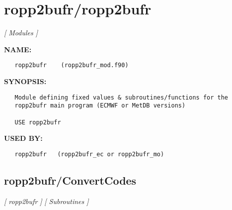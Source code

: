 \section{ropp2bufr/ropp2bufr}
\textsl{[ Modules ]}

\label{ch:robo102}
\label{ch:ropp2bufr_ropp2bufr}
\textbf{NAME:}\hspace{0.08in}\begin{Verbatim}
   ropp2bufr    (ropp2bufr_mod.f90)
\end{Verbatim}
\textbf{SYNOPSIS:}\hspace{0.08in}\begin{Verbatim}
   Module defining fixed values & subroutines/functions for the
   ropp2bufr main program (ECMWF or MetDB versions)

   USE ropp2bufr
\end{Verbatim}
\textbf{USED BY:}\hspace{0.08in}\begin{Verbatim}
   ropp2bufr   (ropp2bufr_ec or ropp2bufr_mo)
\end{Verbatim}
\subsection{ropp2bufr/ConvertCodes}
\textsl{[ ropp2bufr ]}
\textsl{[ Subroutines ]}

